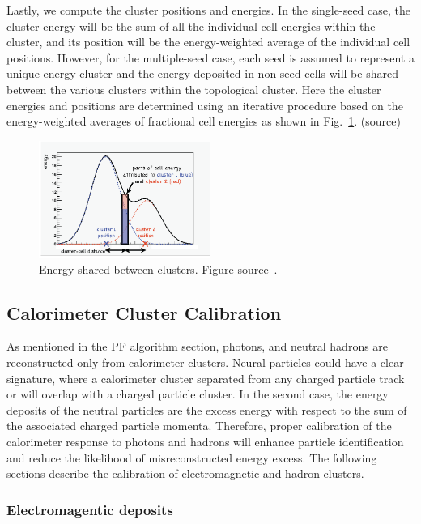 Lastly, we compute the cluster positions and energies.
In the single-seed case, the cluster energy will be the sum of all the individual cell energies within the cluster, and its position will be the energy-weighted average of the individual cell positions.
However, for the multiple-seed case, each seed is assumed to represent a unique energy cluster and the energy deposited in non-seed cells will be shared between the various clusters within the topological cluster.
Here the cluster energies and positions are determined using an iterative procedure based on the energy-weighted averages of fractional cell energies as shown in Fig.~\ref{fig:clustering}. (source)

\begin{figure}[t!]
\centering
\includegraphics[width=0.50\textwidth]{figures/energy_sharing.png}
\caption[Energy shared between clusters]{Energy shared between clusters. Figure source~\cite{Clustering}.}
\label{fig:clustering}
\end{figure}

\subsection{Calorimeter Cluster Calibration}
As mentioned in the PF algorithm section, photons, and neutral hadrons are reconstructed only from calorimeter clusters.
Neural particles could have a clear signature, where a calorimeter cluster separated from any charged particle track or will overlap with a charged particle cluster.
In the second case, the energy deposits of the neutral particles are the excess energy with respect to the sum of the associated charged particle momenta. Therefore, proper calibration of the calorimeter response to photons and hadrons will enhance particle identification and reduce the likelihood of misreconstructed energy excess.
The following sections describe the calibration of electromagnetic and hadron clusters.


\subsubsection{Electromagentic deposits}

